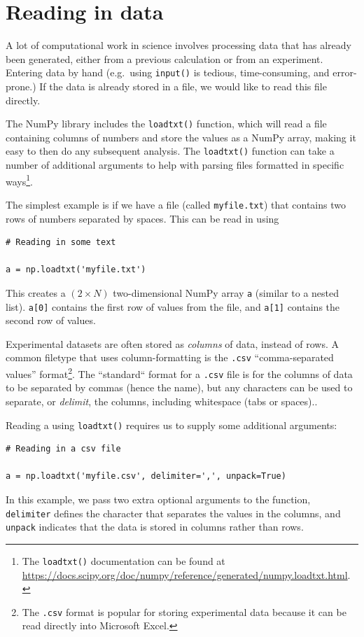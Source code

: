 \documentclass[a4paper]{article}
\begin{document}
\section{Reading in data}

A lot of computational work in science involves processing data that has already been generated, either from a previous calculation or from an experiment. Entering data by hand (e.g.\ using \texttt{input()} is tedious, time-consuming, and error-prone.) If the data is already stored in a file, we would like to read this file directly.

The NumPy library includes the \texttt{loadtxt()} function, which will read a file containing columns of numbers and store the values as a NumPy array, making it easy to then do any subsequent analysis.
The \texttt{loadtxt()} function can take a number of additional arguments to help with parsing files formatted in specific ways\footnote{The \texttt{loadtxt()} documentation can be found at \url{https://docs.scipy.org/doc/numpy/reference/generated/numpy.loadtxt.html}.}.

The simplest example is if we have a file (called \texttt{myfile.txt}) that contains two rows of numbers separated by spaces. This can be read in using
\begin{lstlisting}
# Reading in some text

a = np.loadtxt('myfile.txt')
\end{lstlisting}
This creates a $(2\times N)$ two-dimensional NumPy array \texttt{a} (similar to a nested list). \texttt{a[0]} contains the first row of values from the file, and \texttt{a[1]} contains the second row of values.

Experimental datasets are often stored as \emph{columns} of data, instead of rows. A common filetype that uses column-formatting is the \texttt{.csv} ``comma-separated values'' format\footnote{The \texttt{.csv} format is popular for storing experimental data because it can be read directly into Microsoft Excel.}. The ``standard`` format for a \texttt{.csv} file is for the columns of data to be separated by commas (hence the name), but any characters can be used to separate, or \emph{delimit}, the columns, including whitespace (tabs or spaces)..

Reading a  using \texttt{loadtxt()} requires us to supply some additional arguments:
\begin{lstlisting}
# Reading in a csv file

a = np.loadtxt('myfile.csv', delimiter=',', unpack=True)
\end{lstlisting}
In this example, we pass two extra optional arguments to the function, \texttt{delimiter} defines the character that separates the values in the columns, and \texttt{unpack} indicates that the data is stored in columns rather than rows.
\end{document}
